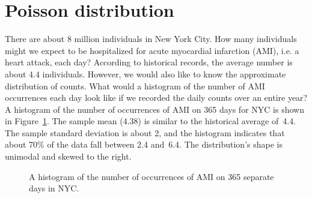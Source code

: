

{}





\section{Poisson distribution}
\label{poisson}


\begin{examplewrap}
\begin{nexample}{There are about 8 million individuals
    in New York City.
    How many individuals might we expect to be hospitalized
    for acute myocardial infarction (AMI), i.e. a heart attack,
    each day?
    According to historical records, the average number is
    about 4.4 individuals.
    However, we would also like to know the approximate
    distribution of counts.
    What would a histogram of the number of AMI occurrences
    each day look like if we recorded the daily counts over
    an entire year?}
  \label{amiIncidencesEachDayOver1YearInNYCExample}%
  A histogram of the number of occurrences of AMI on 365 days
  for NYC is shown in
  Figure~\ref{amiIncidencesOver100Days}.\footnotemark{}
  The sample mean (4.38) is similar to the historical average
  of~4.4.
  The sample standard deviation is about 2, and the histogram
  indicates that about 70\% of the data fall between 2.4 and~6.4.
  The distribution's shape is unimodal and skewed to the right.
\end{nexample}
\end{examplewrap}

\begin{figure}[h]
  \centering
  \caption{A histogram of the number of occurrences
      of AMI on 365 separate days in NYC.}
  \label{amiIncidencesOver100Days}
\end{figure}

